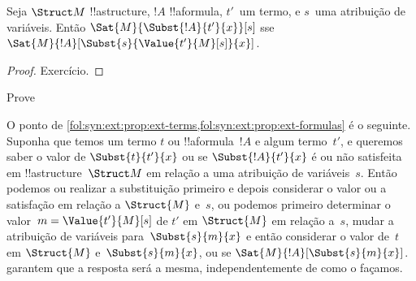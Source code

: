 \documentclass[../../../include/open-logic-section]{subfiles}
\begin{document}
\begin{prop} Seja $\Struct M$
!!a{structure}, $!A$ !!a{formula}, $t'$~um termo, e $s$~uma
atribuição de variáveis. Então $\Sat{M}{\Subst{!A}{t'}{x}}[s]$ sse
$\Sat{M}{!A}[\Subst{s}{\Value{t'}{M}[s]}{x}]$.
\end{prop}

\begin{proof}
Exercício.
\end{proof}

\begin{prob}
Prove 
\end{prob}

\begin{explain}
  O ponto de
  \cref{fol:syn:ext:prop:ext-terms,fol:syn:ext:prop:ext-formulas} é
  o seguinte. Suponha que temos um termo $t$ ou !!a{formula}~$!A$ e
  algum termo~$t'$, e queremos saber o valor de $\Subst{t}{t'}{x}$
  ou se $\Subst{!A}{t'}{x}$ é ou não satisfeita em
  !!a{structure}~$\Struct M$ em relação a uma atribuição de variáveis~$s$.
  Então podemos ou realizar a substituição primeiro e depois considerar
  o valor ou a satisfação em relação a $\Struct{M}$ e~$s$, ou
  podemos primeiro determinar o valor~$m = \Value{t'}{M}[s]$ de $t'$ em
  $\Struct{M}$ em relação a~$s$, mudar a atribuição de variáveis
  para~$\Subst{s}{m}{x}$ e então considerar o valor de~$t$ em
  $\Struct{M}$ e~$\Subst{s}{m}{x}$, ou se
  $\Sat{M}{!A}[\Subst{s}{m}{x}]$.
  garantem que a resposta será a mesma, independentemente de como o façamos.
\end{explain}
\end{document}
